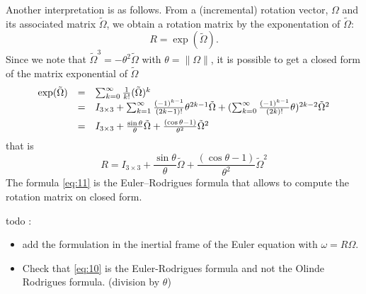 Another interpretation is as follows. From a (incremental) rotation vector, $\Omega$ and its associated matrix $\tilde \Omega$, we obtain a rotation matrix by the exponentation of $\tilde \Omega$:
\begin{equation}
  \label{eq:9}
  R = \exp(\tilde\Omega).
\end{equation}
Since we note that $\tilde \Omega^ 3 = - \theta^2 \tilde \Omega$ with $\theta = \|\Omega\|$, it is possible to get a closed form of the matrix exponential of $\tilde \Omega$
\begin{equation}
  \label{eq:10}
  \begin{array}[lcl]{lcl}
    \exp(\tilde \Omega) &=& \sum_{k=0}^{\infty} \frac {1}{k!} (\tilde \Omega)^k \\
                        &=&  I_{3\times 3} + \sum_{k=1}^{\infty} \frac {(-1)^{k-1}}{(2k-1)!}  \theta ^{2k-1} \tilde \Omega + (\sum_{k=0}^{\infty} \frac {(-1)^{k-1}}{(2k)!} \theta)^{2k-2} \tilde \Omega^2\\[2mm]
                        &=&  I_{3\times 3} + \frac{\sin{\theta}} {\theta} \tilde \Omega +  \frac{(\cos{\theta}-1)}{\theta^2}\tilde \Omega^2   
  \end{array} 
\end{equation}
that is
\begin{equation}
  \label{eq:11}
  R =  I_{3\times 3} + \frac{\sin{\theta}} {\theta} \tilde \Omega +  \frac{(\cos{\theta}-1)}{\theta^2}\tilde \Omega^2  
\end{equation}
The formula \eqref{eq:11} is the Euler--Rodrigues formula that allows to compute the rotation matrix on closed form.


\begin{ndrva}
  todo :
  \begin{itemize}
  \item add the formulation in the inertial frame of the Euler
    equation with $\omega =R \Omega$.
  \item Check that \eqref{eq:10} is the Euler-Rodrigues formula and not the Olinde Rodrigues formula. (division by $\theta$)
\end{itemize}

\end{ndrva}

